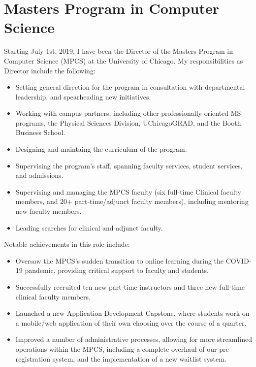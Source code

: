 \documentclass{resume}
\begin{document}
\section*{\hspace{-1cm}Masters Program in Computer Science}

Starting July 1st, 2019, I have been the Director of the Masters Program in Computer Science (MPCS) at the University of Chicago. My responsibilities as Director include the following:

\begin{itemize}
 \item Setting general direction for the program in consultation with departmental leadership, and spearheading new initiatives.
 \item Working with campus partners, including other professionally-oriented MS programs, the Physical Sciences Division, UChicagoGRAD, and the Booth Business School.
 \item Designing and maintaing the curriculum of the program.
 \item Supervising the program's staff, spanning faculty services, student services, and admissions.
 \item Supervising and managing the MPCS faculty (six full-time Clinical faculty members, and 20+ part-time/adjunct faculty members), including mentoring new faculty members.
 \item Leading searches for clinical and adjunct faculty.
\end{itemize}

\noindent Notable achievements in this role include:

\begin{itemize}
 \item Oversaw the MPCS’s sudden transition to online learning during the COVID-19 pandemic, providing critical support to faculty and students.
 \item Successfully recruited ten new part-time instructors and three new full-time clinical faculty members.
 \item Launched a new Application Development Capstone, where students work on a mobile/web application of their own choosing over the course of a quarter.
 \item Improved a number of administrative processes, allowing for more streamlined operations within the MPCS, including a complete overhaul of our pre-registration system, and the implementation of a new waitlist system. 
\end{itemize}
\end{document}

